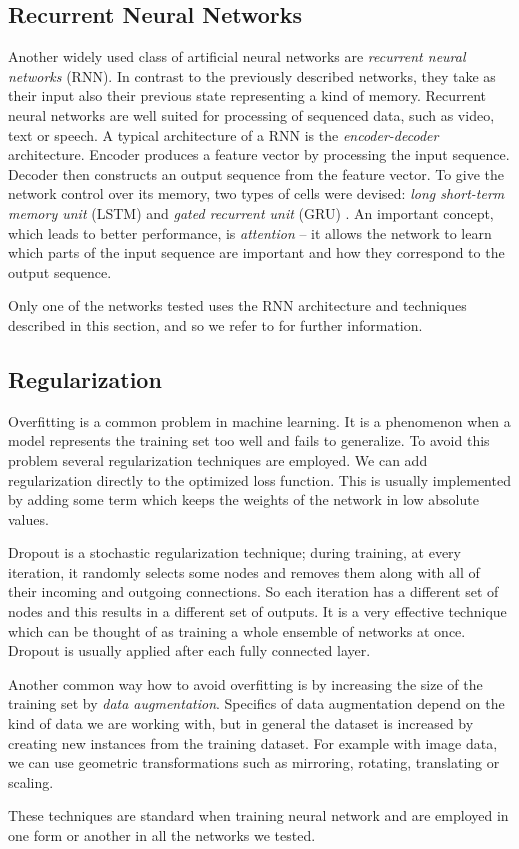 \subsection{Recurrent Neural Networks}
\label{sec:rnns}
Another widely used class of artificial neural networks are \textit{recurrent neural networks} (RNN). In contrast to the previously described networks, they take as their input also their previous state representing a kind of memory. Recurrent neural networks are well suited for processing of sequenced data, such as video, text or speech. A typical architecture of a RNN is the \textit{encoder-decoder} architecture. Encoder produces a feature vector by processing the input sequence. Decoder then constructs an output sequence from the feature vector. To give the network control over its memory, two types of cells were devised: \textit{long short-term memory unit} (LSTM) \cite{hochreiter_long_1997} and \textit{gated recurrent unit} (GRU) \cite{cho_learning_2014}. An important concept, which leads to better performance, is \textit{attention} \cite{bahdanau_neural_2014} -- it allows the network to learn which parts of the input sequence are important and how they correspond to the output sequence.\par
Only one of the networks tested uses the RNN architecture and techniques described in this section, and  so we refer to \cite{goodfellow_deep_2016} for further information. 

\subsection{Regularization}
\label{sec:regularization}
Overfitting is a common problem in machine learning. It is a phenomenon when a model represents the training set too well and fails to generalize. To avoid this problem several regularization techniques are employed. We can add regularization directly to the optimized loss function. This is usually implemented by adding some term which keeps the weights of the network in low absolute values. \par
Dropout \cite{srivastava_dropout:_2014} is a stochastic regularization technique; during training, at every iteration, it randomly selects some nodes and removes them along with all of their incoming and outgoing connections. So each iteration has a different set of nodes and this results in a different set of outputs. It is a very effective technique which can be thought of as training a whole ensemble of networks at once. Dropout is usually applied after each fully connected layer. \par
Another common way how to avoid overfitting is by increasing the size of the training set by \textit{data augmentation}. Specifics of data augmentation depend on the kind of data we are working with, but in general the dataset is increased by creating new instances from the training dataset. For example with image data, we can use geometric transformations such as mirroring, rotating, translating or scaling. \par
These techniques are standard when training neural network and are employed in one form or another in all the networks we tested.

